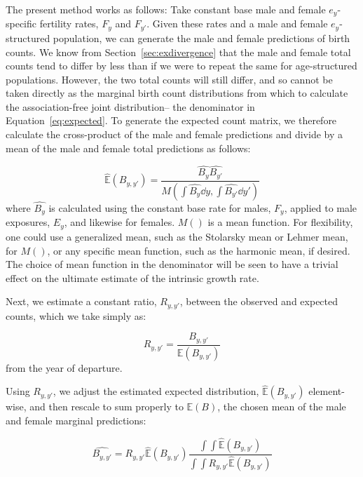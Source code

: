 
The present method works as follows: Take constant base male and female
$e_y$-specific fertility rates, $F_y$ and $F_{y'}$. Given these rates and a male
and female $e_y$-structured population, we can generate the male and female predictions of
birth counts. We know from Section~\ref{sec:exdivergence} that the male and
female total counts tend to differ by less than if we were to repeat the
same for age-structured populations. However, the two total counts will still
differ, and so cannot be taken directly as the marginal birth count distributions from
which to calculate the association-free joint distribution-- the denominator
in Equation~\eqref{eq:expected}. To generate the expected count matrix, we
therefore calculate the cross-product of the male and female predictions and
divide by a mean of the male and female total predictions as follows:

\begin{equation}
\label{eq:meanexp}
\widehat{\mathbb{E}}(B_{y,y'}) = \frac{\widehat{B_y} \widehat{B_{y'}}}{M(\int
\widehat{B_y} \dd y, \int \widehat{B_{y'}} \dd y')}
\end{equation}
where $\widehat{B_y}$ is calculated using the constant base rate for males,
$F_y$, applied to male exposures, $E_y$, and likewise for females. $M()$ is a
mean function. For flexibility, one could use a generalized mean, such as the
Stolarsky mean or Lehmer mean, for $M()$, or any specific mean function, such as
the harmonic mean, if desired. The choice of mean function in the denominator
will be seen to have a trivial effect on the ultimate estimate of the
intrinsic growth rate.

Next, we estimate a constant ratio, $R_{y,y'}$, between the
observed and expected counts, which we take simply as:

\begin{equation}
\label{eq:getR}
R_{y,y'} = \frac{B_{y,y'}}{\mathbb{E}(B_{y,y'})}
\end{equation}
from the year of departure.

Using $R_{y,y'}$, we adjust the estimated expected distribution,
$\widehat{\mathbb{E}}(B_{y,y'})$ element-wise, and then rescale to sum properly
to $\mathbb{E}(B)$, the chosen mean of the male and female marginal
predictions:

\begin{equation}
\label{eq:ratioadj}
\widehat{B_{y,y'}} = R_{y,y'}\widehat{\mathbb{E}}(B_{y,y'})\frac{\int \int
\widehat{\mathbb{E}}(B_{y,y'})}{\int \int
R_{y,y'}\widehat{\mathbb{E}}(B_{y,y'})}
\end{equation}

